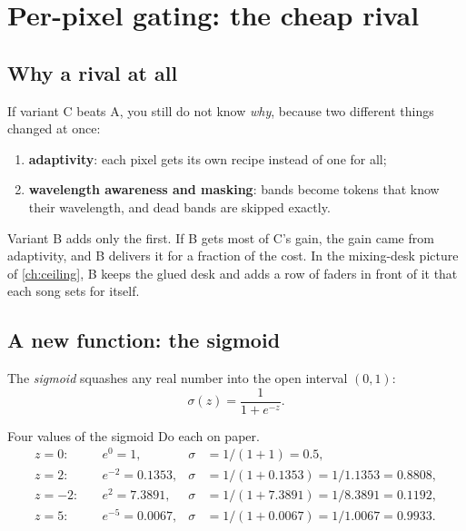 \section{Per-pixel gating: the cheap rival}\label{sec:specdecoder:gate}

\subsection{Why a rival at all}

If variant C beats A, you still do not know \emph{why}, because two different things changed at once:
\begin{enumerate}
\item \textbf{adaptivity}: each pixel gets its own recipe instead of one for all;
\item \textbf{wavelength awareness and masking}: bands become tokens that know their wavelength, and dead bands are skipped exactly.
\end{enumerate}
Variant B adds only the first. If B gets most of C's gain, the gain came from adaptivity, and B delivers it for a fraction of the cost. In the mixing-desk picture of \cref{ch:ceiling}, B keeps the glued desk and adds a row of faders in front of it that each song sets for itself.

\subsection{A new function: the sigmoid}

\begin{definition}[Sigmoid]
The \emph{sigmoid} squashes any real number into the open interval $(0, 1)$:
\begin{equation}\label{eq:specdecoder:sigmoid}
  \sigma(z) = \frac{1}{1 + e^{-z}} .
\end{equation}
\end{definition}

\begin{worked}[label={we:specdecoder:sigmoid}]{Four values of the sigmoid}
Do each on paper.
\begin{align*}
  z = 0:&\quad e^{0} = 1, & \sigma &= 1/(1 + 1) = 0.5,\\
  z = 2:&\quad e^{-2} = 0.1353, & \sigma &= 1/(1 + 0.1353) = 1/1.1353 = 0.8808,\\
  z = -2:&\quad e^{2} = 7.3891, & \sigma &= 1/(1 + 7.3891) = 1/8.3891 = 0.1192,\\
  z = 5:&\quad e^{-5} = 0.0067, & \sigma &= 1/(1 + 0.0067) = 1/1.0067 = 0.9933 .
\end{align*}
\end{worked}

